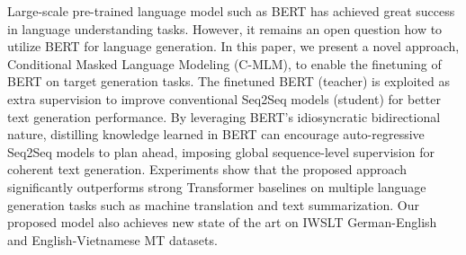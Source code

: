 Large-scale pre-trained language model such as BERT has achieved great success in language understanding tasks. However, it remains an open question how to utilize BERT for language generation. In this paper, we present a novel approach, Conditional Masked Language Modeling (C-MLM), to enable the finetuning of BERT on target generation tasks. The finetuned BERT (teacher) is exploited as extra supervision to improve conventional Seq2Seq models (student) for better text generation performance. By leveraging BERT's idiosyncratic bidirectional nature, distilling knowledge learned in BERT can encourage auto-regressive Seq2Seq models to plan ahead, imposing global sequence-level supervision for coherent text generation. Experiments show that the proposed approach significantly outperforms strong Transformer baselines on multiple language generation tasks such as machine translation and text summarization. Our proposed model also achieves new state of the art on IWSLT German-English and English-Vietnamese MT datasets.
